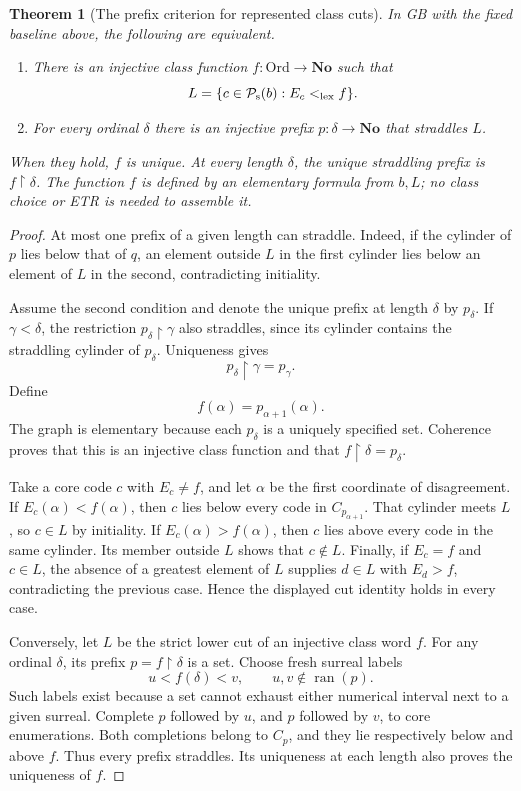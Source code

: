 \documentclass[11pt]{article}
\newtheorem{theorem}{Theorem}[section]
\theoremstyle{definition}
\theoremstyle{remark}
\newcommand{\No}{\mathbf{No}}
\newcommand{\Ord}{\mathrm{Ord}}
\newcommand{\Psupp}{\mathcal P_{\mathrm{s}}}
\begin{document}
\begin{theorem}[The prefix criterion for represented class cuts]
\label{swo:sh:thm:represented-class-cut}
In GB with the fixed baseline above, the following are equivalent.
\begin{enumerate}
\item There is an injective class function
$f:\Ord\to\No$ such that
\[
 L=\{c\in\Psupp(b):E_c<_{\rm lex}f\}.
\]
\item For every ordinal $\delta$ there is an injective prefix
$p:\delta\to\No$ that straddles $L$.
\end{enumerate}
When they hold, $f$ is unique.  At every length $\delta$, the unique
straddling prefix is $f\restriction\delta$.  The function $f$ is
defined by an elementary formula from $b,L$; no class choice or ETR
is needed to assemble it.
\end{theorem}
\begin{proof}
At most one prefix of a given length can straddle.  Indeed, if the
cylinder of $p$ lies below that of $q$, an element outside $L$ in
the first cylinder lies below an element of $L$ in the second,
contradicting initiality.

Assume the second condition and denote the unique prefix at length
$\delta$ by $p_\delta$.  If $\gamma<\delta$, the restriction
$p_\delta\restriction\gamma$ also straddles, since its cylinder
contains the straddling cylinder of $p_\delta$.  Uniqueness gives
\[
 p_\delta\restriction\gamma=p_\gamma.
\]
Define
\[
 f(\alpha)=p_{\alpha+1}(\alpha).
\]
The graph is elementary because each $p_\delta$ is a uniquely
specified set.  Coherence proves that this is an injective class
function and that $f\restriction\delta=p_\delta$.

Take a core code $c$ with $E_c\ne f$, and let $\alpha$ be the first
coordinate of disagreement.  If $E_c(\alpha)<f(\alpha)$, then
$c$ lies below every code in $C_{p_{\alpha+1}}$.
That cylinder meets $L$, so $c\in L$ by initiality.  If
$E_c(\alpha)>f(\alpha)$, then $c$ lies above every code in the
same cylinder.  Its member outside $L$ shows that $c\notin L$.
Finally, if $E_c=f$ and $c\in L$, the absence of a greatest element
of $L$ supplies $d\in L$ with $E_d>f$, contradicting the previous
case.  Hence the displayed cut identity holds in every case.

Conversely, let $L$ be the strict lower cut of an injective class
word $f$.  For any ordinal $\delta$, its prefix
$p=f\restriction\delta$ is a set.  Choose fresh surreal labels
\[
 u<f(\delta)<v,
 \qquad u,v\notin\operatorname{ran}(p).
\]
Such labels exist because a set cannot exhaust either numerical
interval next to a given surreal.  Complete $p$ followed by $u$,
and $p$ followed by $v$, to core enumerations.  Both completions
belong to $C_{p}$, and they lie respectively below and
above $f$.  Thus every prefix straddles.  Its uniqueness at each
length also proves the uniqueness of $f$.
\end{proof}
\end{document}
